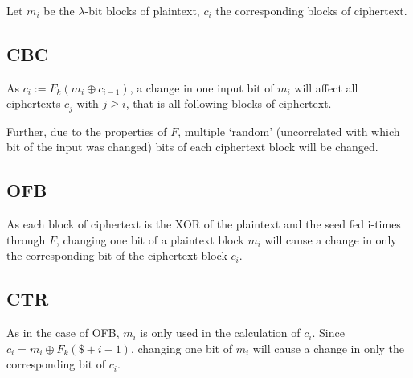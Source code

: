 \documentclass[a4paper]{scrreprt}
\begin{document}
Let $m_i$ be the $\lambda$-bit blocks of plaintext, $c_i$ the corresponding
blocks of ciphertext.

\subsection{CBC}

As $c_i := F_k(m_i \oplus c_{i-1})$, a change in one input bit of $m_i$ will
affect all ciphertexts $c_j$ with $j \geq i$, that is all following blocks of
ciphertext.

Further, due to the properties of $F$, multiple `random' (uncorrelated with
which bit of the input was changed) bits of each ciphertext block will be
changed.

\subsection{OFB}

As each block of ciphertext is the XOR of the plaintext and the seed fed
i-times through $F$, changing one bit of a plaintext block $m_i$ will cause a
change in only the corresponding bit of the ciphertext block $c_i$.

\subsection{CTR}

As in the case of OFB, $m_i$ is only used in the calculation of $c_i$. Since
$c_i = m_i \oplus F_k(\$ + i - 1)$, changing one bit of $m_i$ will cause a
change in only the corresponding bit of $c_i$.
\end{document}
